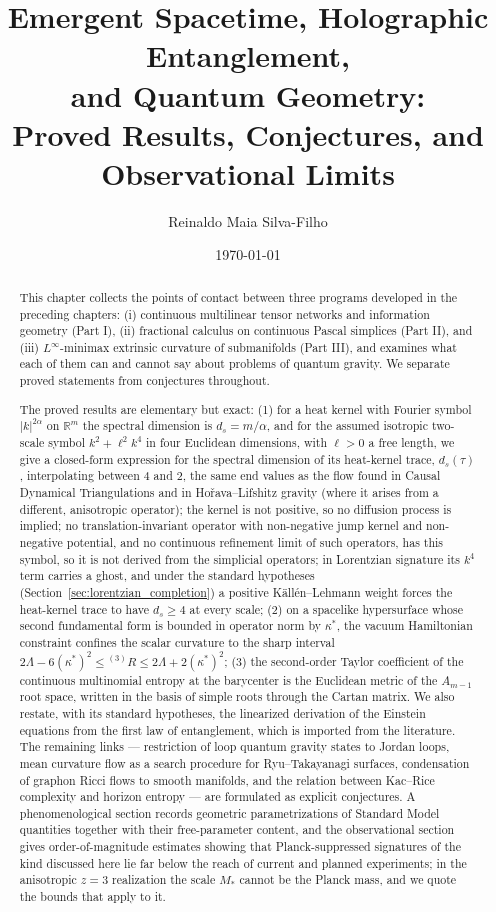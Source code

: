 \documentclass[11pt,a4paper,reqno]{amsart}
\title[Emergent Spacetime and Quantum Geometry]{Emergent Spacetime, Holographic Entanglement,\\ and Quantum Geometry:\\ Proved Results, Conjectures, and Observational Limits}
\author{Reinaldo Maia Silva-Filho}
\date{\today}
\theoremstyle{definition}
\numberwithin{equation}{section}
\providecommand{\R}{\mathbb{R}}
\providecommand{\R}{\mathbb{R}}
\begin{document}
\begin{abstract}
This chapter collects the points of contact between three programs developed in the preceding chapters: (i) continuous multilinear tensor networks and information geometry (Part I), (ii) fractional calculus on continuous Pascal simplices (Part II), and (iii) $L^\infty$-minimax extrinsic curvature of submanifolds (Part III), and examines what each of them can and cannot say about problems of quantum gravity. We separate proved statements from conjectures throughout.

The proved results are elementary but exact:
(1) for a heat kernel with Fourier symbol $|k|^{2\alpha}$ on $\R^m$ the spectral dimension is $d_s = m/\alpha$, and for the assumed isotropic two-scale symbol $k^2 + \ell^2 k^4$ in four Euclidean dimensions, with $\ell > 0$ a free length, we give a closed-form expression for the spectral dimension of its heat-kernel trace, $d_s(\tau)$, interpolating between $4$ and $2$, the same end values as the flow found in Causal Dynamical Triangulations and in Ho\v{r}ava--Lifshitz gravity (where it arises from a different, anisotropic operator); the kernel is not positive, so no diffusion process is implied; no translation-invariant operator with non-negative jump kernel and non-negative potential, and no continuous refinement limit of such operators, has this symbol, so it is not derived from the simplicial operators; in Lorentzian signature its $k^4$ term carries a ghost, and under the standard hypotheses (Section~\ref{sec:lorentzian_completion}) a positive K\"all\'en--Lehmann weight forces the heat-kernel trace to have $d_s \ge 4$ at every scale;
(2) on a spacelike hypersurface whose second fundamental form is bounded in operator norm by $\kappa^*$, the vacuum Hamiltonian constraint confines the scalar curvature to the sharp interval $2\Lambda - 6(\kappa^*)^2 \le {}^{(3)}R \le 2\Lambda + 2(\kappa^*)^2$;
(3) the second-order Taylor coefficient of the continuous multinomial entropy at the barycenter is the Euclidean metric of the $A_{m-1}$ root space, written in the basis of simple roots through the Cartan matrix.
We also restate, with its standard hypotheses, the linearized derivation of the Einstein equations from the first law of entanglement, which is imported from the literature.
The remaining links --- restriction of loop quantum gravity states to Jordan loops, mean curvature flow as a search procedure for Ryu--Takayanagi surfaces, condensation of graphon Ricci flows to smooth manifolds, and the relation between Kac--Rice complexity and horizon entropy --- are formulated as explicit conjectures. A phenomenological section records geometric parametrizations of Standard Model quantities together with their free-parameter content, and the observational section gives order-of-magnitude estimates showing that Planck-suppressed signatures of the kind discussed here lie far below the reach of current and planned experiments; in the anisotropic $z = 3$ realization the scale $M_\ast$ cannot be the Planck mass, and we quote the bounds that apply to it.
\end{abstract}
\end{document}

